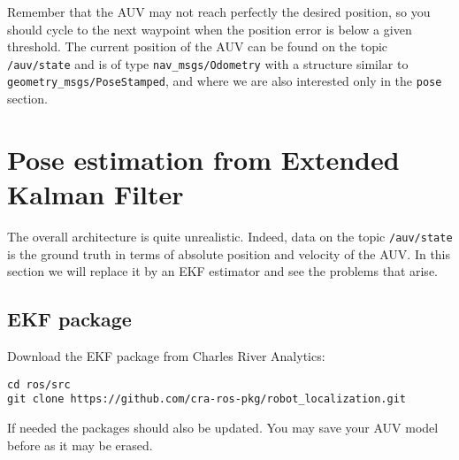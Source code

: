 \documentclass{ecnreport}
\begin{document}
Remember that the AUV may not reach perfectly the desired position, so you should cycle to the next waypoint when the position error is below a given threshold.
The current position of the AUV can be found on the topic \texttt{/auv/state} and is of type \texttt{nav\_msgs/Odometry} with a structure similar to \texttt{geometry\_msgs/PoseStamped}, and where we are also interested only
in the \texttt{pose} section.

\newpage

\section{Pose estimation from Extended Kalman Filter}

The overall architecture is quite unrealistic. Indeed, data on the topic \texttt{/auv/state} is the ground truth in terms of absolute position and velocity of the AUV.
In this section we will replace it by an EKF estimator and see the problems that arise.

\subsection{EKF package}

Download the EKF package from Charles River Analytics:

\begin{center}
\begin{lstlisting}
cd ros/src
git clone https://github.com/cra-ros-pkg/robot_localization.git
\end{lstlisting}
\end{center}

If needed the packages should also be updated. You may save your AUV model before as it may be erased.
\end{document}
